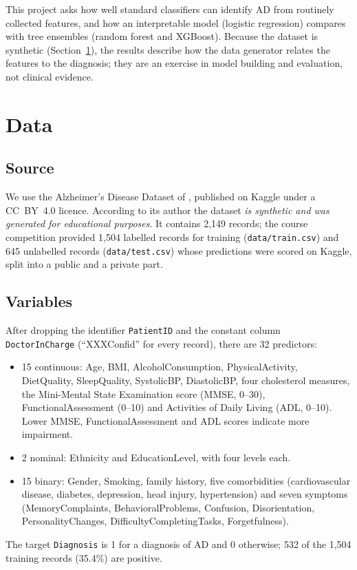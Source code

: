 \documentclass[11pt]{article}
\begin{document}
This project asks how well standard classifiers can identify AD from routinely collected features,
and how an interpretable model (logistic regression) compares with tree ensembles (random forest and
XGBoost). Because the dataset is synthetic (Section~\ref{sec:data}), the results describe how the data
generator relates the features to the diagnosis; they are an exercise in model building and evaluation,
not clinical evidence.

\section{Data}\label{sec:data}

\subsection{Source}
We use the Alzheimer's Disease Dataset of \citet{elkharoua2024dataset}, published on Kaggle under a
CC~BY~4.0 licence. According to its author the dataset \emph{is synthetic and was generated for
educational purposes}. It contains 2,149 records; the course competition provided 1,504 labelled records
for training (\texttt{data/train.csv}) and 645 unlabelled records (\texttt{data/test.csv}) whose
predictions were scored on Kaggle, split into a public and a private part.

\subsection{Variables}
After dropping the identifier \texttt{PatientID} and the constant column \texttt{DoctorInCharge}
(``XXXConfid'' for every record), there are 32 predictors:
\begin{itemize}
  \item 15 continuous: Age, BMI, AlcoholConsumption, PhysicalActivity, DietQuality, SleepQuality,
  SystolicBP, DiastolicBP, four cholesterol measures, the Mini-Mental State Examination score (MMSE,
  0--30), FunctionalAssessment (0--10) and Activities of Daily Living (ADL, 0--10). Lower MMSE,
  FunctionalAssessment and ADL scores indicate more impairment.
  \item 2 nominal: Ethnicity and EducationLevel, with four levels each.
  \item 15 binary: Gender, Smoking, family history, five comorbidities (cardiovascular disease, diabetes,
  depression, head injury, hypertension) and seven symptoms (MemoryComplaints, BehavioralProblems,
  Confusion, Disorientation, PersonalityChanges, DifficultyCompletingTasks, Forgetfulness).
\end{itemize}
The target \texttt{Diagnosis} is 1 for a diagnosis of AD and 0 otherwise; 532 of the 1,504 training
records (35.4\%) are positive.
\end{document}
